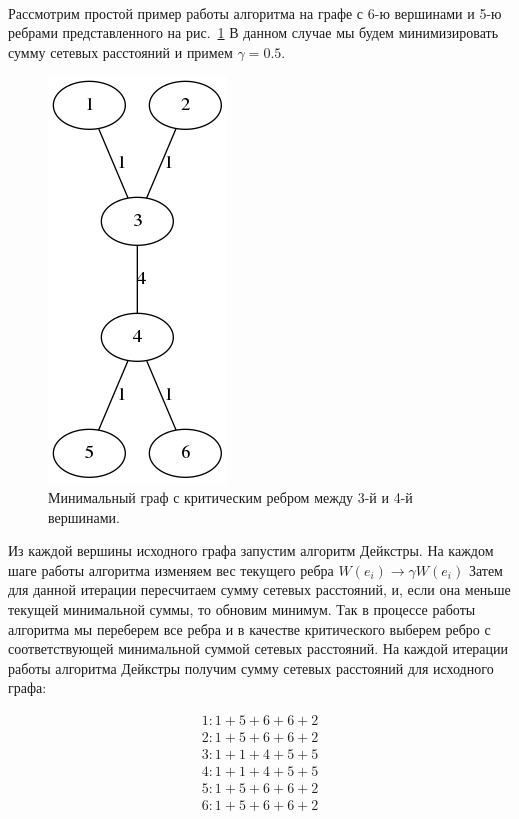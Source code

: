 \documentclass[12pt]{article}
\begin{document}
\paragraph{}

Рассмотрим простой пример работы алгоритма на графе с 6-ю вершинами и 5-ю ребрами
представленного на рис.~\ref{fig:min_graph_4} В данном случае мы будем минимизировать сумму сетевых расстояний и
примем $\gamma = 0.5$.

\begin{figure}[h]
    \centering
    \includegraphics[scale=0.7]{min_graph_4.png}
    \caption{Минимальный граф с критическим ребром между 3-й и 4-й вершинами.}
    \label{fig:min_graph_4}
\end{figure}

Из каждой вершины исходного графа запустим алгоритм Дейкстры.
На каждом шаге работы алгоритма изменяем вес текущего ребра $W(e_i) \rightarrow \gamma W(e_i)$
Затем для данной итерации пересчитаем сумму сетевых расстояний, и, если она меньше текущей минимальной суммы,
то обновим минимум. Так в процессе работы алгоритма мы переберем все ребра и в качестве критического выберем 
ребро с соответствующей минимальной суммой сетевых расстояний. 
На каждой итерации работы алгоритма Дейкстры получим сумму сетевых расстояний для исходного графа:

\begin{gather}
1 : 1 + 5 + 6 + 6 + 2 \\
2 : 1 + 5 + 6 + 6 + 2 \\
3 : 1 + 1 + 4 + 5 + 5 \\
4 : 1 + 1 + 4 + 5 + 5 \\
5 : 1 + 5 + 6 + 6 + 2 \\
6 : 1 + 5 + 6 + 6 + 2
\end{gather}
\end{document}

